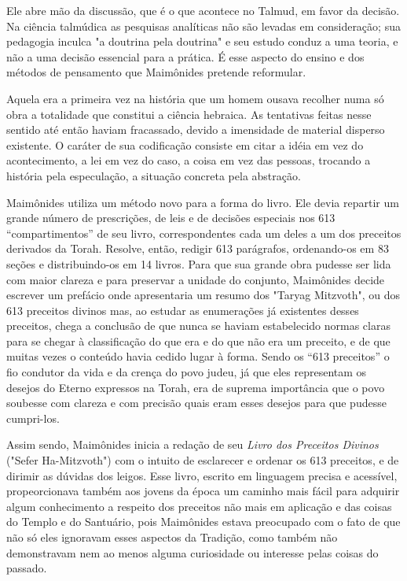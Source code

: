 Ele abre mão da discussão, que é o que acontece no Talmud, em
favor da decisão. Na ciência talmúdica as pesquisas analíticas não são
levadas em consideração; sua pedagogia inculca "a doutrina pela
doutrina" e seu estu­do conduz a uma teoria, e não a uma decisão
essencial para a prática. É esse aspecto do ensino e dos métodos de
pensamento que Maimônides pretende reformular.

Aquela era a primeira vez na história que um homem ousava reco­lher numa
só obra a totalidade que constitui a ciência hebraica. As tentativas
feitas nesse sentido até então haviam fracassado, devido a imensidade de
mate­rial disperso existente. O caráter de sua codificação consiste em
citar a idéia em vez do acontecimento, a lei em vez do caso, a coisa em
vez das pessoas, trocando a história pela especulação, a situação
concreta pela abstração.

Maimônides utiliza um método novo para a forma do livro. Ele de­via
repartir um grande número de prescrições, de leis e de decisões
especiais nos 613 ``compartimentos'' de seu livro, correspondentes cada um
deles a um dos preceitos derivados da Torah. Resolve, então, redigir 613
parágrafos, orde­nando-os em 83 seções e distribuindo-os em 14 livros.
Para que sua grande obra pudesse ser lida com maior clareza e para
preservar a unidade do conjunto, Mai­mônides decide escrever um prefácio
onde apresentaria um resumo dos "Tar­yag Mitzvoth", ou dos 613 preceitos
divinos mas, ao estudar as enumerações já existentes desses preceitos,
chega a conclusão de que nunca se haviam esta­belecido normas claras
para se chegar à classificação do que era e do que não era um preceito,
e de que muitas vezes o conteúdo havia cedido lugar à forma. Sendo os
``613 preceitos'' o fio condutor da vida e da crença do povo judeu, já que
eles representam os desejos do Eterno expressos na Torah, era de
supre­ma importância que o povo soubesse com clareza e com precisão
quais eram esses desejos para que pudesse cumpri-los.

Assim sendo, Maimônides inicia a redação de seu \emph{Livro dos
Precei­tos Divinos} ("Sefer Ha-Mitzvoth") com o intuito de esclarecer e
ordenar os 613 preceitos, e de dirimir as dúvidas dos leigos. Esse
livro, escrito em linguagem precisa e acessível, propeorcionava também
aos jovens da época um caminho mais fácil para adquirir algum
conhecimento a respeito dos preceitos não mais em aplicação e das coisas
do Templo e do Santuário, pois Maimônides estava preocupado com o fato
de que não só eles ignoravam esses aspectos da Tradi­ção, como também
não demonstravam nem ao menos alguma curiosidade ou interesse pelas
coisas do passado.

